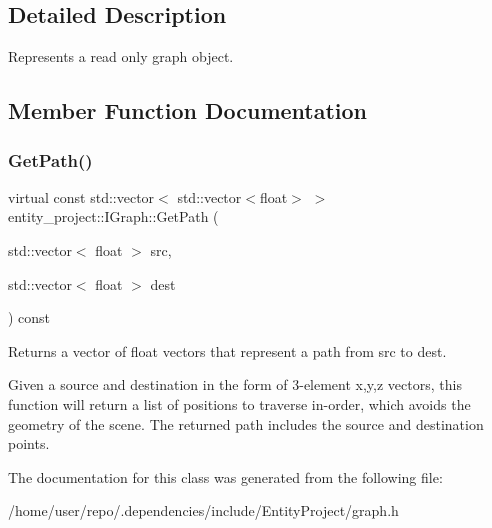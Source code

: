 \subsection{Detailed Description}
Represents a read only graph object. 

\subsection{Member Function Documentation}
\mbox{\label{classentity__project_1_1IGraph_aa96a691b82108d0901463f3cd5cd79b9}} 
\subsubsection{\texorpdfstring{Get\+Path()}{GetPath()}}
{\footnotesize\ttfamily virtual const std\+::vector$<$ std\+::vector$<$float$>$ $>$ entity\+\_\+project\+::\+I\+Graph\+::\+Get\+Path (\begin{DoxyParamCaption}\item[{std\+::vector$<$ float $>$}]{src,  }\item[{std\+::vector$<$ float $>$}]{dest }\end{DoxyParamCaption}) const\hspace{0.3cm}{\ttfamily [pure virtual]}}



Returns a vector of float vectors that represent a path from src to dest. 

Given a source and destination in the form of 3-\/element x,y,z vectors, this function will return a list of positions to traverse in-\/order, which avoids the geometry of the scene. The returned path includes the source and destination points. 

The documentation for this class was generated from the following file\+:\begin{DoxyCompactItemize}
\item 
/home/user/repo/.\+dependencies/include/\+Entity\+Project/graph.\+h\end{DoxyCompactItemize}
